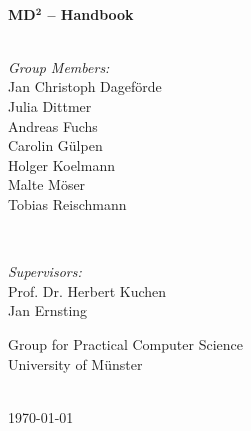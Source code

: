 \documentclass[a4paper, 12pt, titlepage, headsepline, listof = totoc, bibliography = totoc, numbers = noenddot]{scrbook} %
\begin{document}
\begin{titlepage}
\HRule \\[0.8cm]
{ \huge \bfseries MD$\mathbf{^2}$ -- Handbook}\\[0.4cm] %
\HRule \\[3cm]
 

\begin{minipage}[t]{0.4\textwidth}
\begin{flushleft} \large
\emph{Group Members:}\\
Jan Christoph Dageförde\\
Julia Dittmer\\
Andreas Fuchs\\
Carolin Gülpen\\
Holger Koelmann\\
Malte Möser\\
Tobias Reischmann
\end{flushleft}
\end{minipage}
~
\begin{minipage}[t]{0.5\textwidth}
\begin{flushright}\large

\emph{Supervisors:}\\
Prof. Dr. Herbert Kuchen\\
Jan Ernsting\\\bigskip

Group for Practical Computer Science \\
University of Münster\\
\end{flushright}
\end{minipage}\\[3cm]



{\large \today}\\[3cm] %


 

\vfill %

\end{titlepage}
\end{document}
